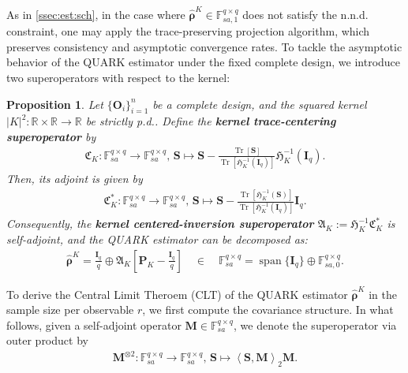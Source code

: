 \documentclass[noinfoline]{imsart}\setcounter{tocdepth}{2}
\renewcommand{\b}[1]{\mathbb{#1}} %
\newcommand{\m}[1]{\mathbf{#1}} %
\newcommand{\f}[1]{\mathfrak{#1}} %
\newcommand{\mb}[1]{\boldsymbol{#1}} %
\newcommand{\tr}[1]{\operatorname{Tr}\left[#1\right]}
\newcommand{\innpr}[2]{{\left\langle {#1},{#2}\right\rangle}} %
\DeclareMathOperator*{\spann}{span}
\theoremstyle{plain}
\newtheorem{proposition}[theorem]{Proposition}
\begin{document}
As in \cref{ssec:est:sch}, in the case where $\hat{\mb{\rho}}^{K} \in \b{F}_{sa, 1}^{q \times q}$ does not satisfy the n.n.d. constraint, one may apply the trace-preserving projection algorithm, which preserves consistency and asymptotic convergence rates.
To tackle the asymptotic behavior of the QUARK estimator under the fixed complete design, we introduce two superoperators with respect to the kernel:
\begin{proposition}\label{prop:ker:tr:centre}
Let $\{\m{O}_{i}\}_{i=1}^n$ be a complete design, and the squared kernel $|K|^2 : \b{R} \times \b{R} \to \b{R}$ be strictly p.d.. Define the \textbf{kernel trace-centering superoperator} by
\begin{align*}
    \f{C}_{K} : \b{F}_{sa}^{q \times q} \to \b{F}_{sa}^{q \times q}, \, \m{S} \mapsto \m{S} - \frac{ \tr{\m{S}}}{\tr{\f{H}_K^{-1}(\m{I}_{q})}} \f{H}_K^{-1}(\m{I}_{q}).
\end{align*}
Then, its adjoint is given by
\begin{align*}
    \f{C}_{K}^{*} : \b{F}_{sa}^{q \times q} \to \b{F}_{sa}^{q \times q}, \, \m{S} \mapsto \m{S} - \frac{ \tr{\f{H}_K^{-1}(\m{S})}}{\tr{\f{H}_K^{-1}(\m{I}_{q})}} \m{I}_{q}.
\end{align*}
Consequently, the \textbf{kernel centered-inversion superoperator} $\f{A}_{K}:= \f{H}_{K}^{-1} \f{C}_{K}^{*}$ is self-adjoint, and the QUARK estimator can be decomposed as:
\begin{align*}
    \hat{\mb{\rho}}^{K} =  \frac{\m{I}_{q}}{q} \oplus \f{A}_{K} \left[\m{P}_K - \frac{\m{I}_{q}}{q} \right] \quad \in \quad \b{F}_{sa}^{q \times q} = \spann\{\m{I}_{q}\} \oplus \b{F}_{sa, 0}^{q \times q}.
\end{align*}
\end{proposition}




To derive the Central Limit Theroem (CLT) of the QUARK estimator $\hat{\mb{\rho}}^{K}$ in the sample size per observable $r$, we first compute the covariance structure. In what follows, given a self-adjoint operator $\m{M} \in \b{F}_{sa}^{q \times q}$, we denote the superoperator via outer product by
\begin{align*}
    \m{M}^{\otimes 2} : \b{F}_{sa}^{q \times q} \to \b{F}_{sa}^{q \times q}, \, \m{S} \mapsto \innpr{\m{S}}{\m{M}}_{2} \m{M}.
\end{align*}
\end{document}

